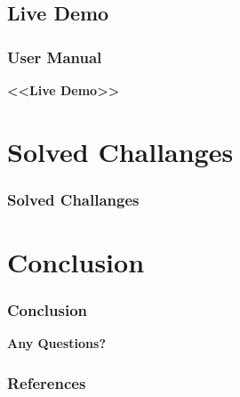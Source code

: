 \documentclass[english,hangout]{beamer}
\begin{document}
\subsection{Live Demo}
\begin{frame}
	\frametitle{User Manual}
	\begin{center}
		\textbf{<<Live Demo>>}		
	\end{center}	
\end{frame}

\section{Solved Challanges}
\begin{frame}
	\frametitle{Solved Challanges}
	
\end{frame}


\section{Conclusion}
\begin{frame}
	\frametitle{Conclusion}

\end{frame}

\begin{frame}
	\begin{center}
		\textbf{Any Questions?}
	\end{center}
\end{frame}

\begin{frame}
	\frametitle{References}
	
\end{frame}
\end{document}

